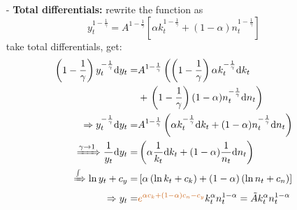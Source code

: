 \documentclass[10pt,landscape,a4paper]{article}
\begin{document}
\begin{multicols*}{3}
\begin{itemize}
\begin{itemize}
        \item[-] \textbf{Total differentials:} rewrite the function as 
        $$
            y_t^{1-\frac{1}{\gamma}}=A^{1-\frac{1}{\gamma}}\left[\alpha k_t^{1-\frac{1}{\gamma}}+(1-\alpha)n_t^{1-\frac{1}{\gamma}}\right]
        $$
        take total differentials, get:
        \begin{align*}
            \left(1-\frac{1}{\gamma}\right)y_t^{-\frac{1}{\gamma}}\mathrm{d}y_t =& A^{1-\frac{1}{\gamma}}\left(\left(1-\frac{1}{\gamma}\right)\alpha k_t^{-\frac{1}{\gamma}}\mathrm{d}k_t\right.\\
            &+\left.\left(1-\frac{1}{\gamma}\right)(1-\alpha)n_t^{-\frac{1}{\gamma}}\mathrm{d}n_t\right)\\
            \Rightarrow y_t^{-\frac{1}{\gamma}}\mathrm{d}y_t =&A^{1-\frac{1}{\gamma}}\left(\alpha k_t^{-\frac{1}{\gamma}}\mathrm{d}k_t +(1-\alpha)n_t^{-\frac{1}{\gamma}}\mathrm{d}n_t\right)\\
            \xRightarrow{\gamma\rightarrow 1} \frac{1}{y_t}\mathrm{d}y_t=&\left(\alpha\frac{1}{k_t}\mathrm{d}k_t+(1-\alpha)\frac{1}{n_t}\mathrm{d}n_t \right)\\
            \xRightarrow{\int} \ln y_t +c_y =& \left[\alpha\left(\ln k_t+c_k\right)+(1-\alpha)\left( \ln n_t+c_n\right) \right]\\
            \Rightarrow y_t =& {\color{myorange}e^{\alpha c_k+(1-\alpha)c_n-c_y}}k_t^{\alpha}n_t^{1-\alpha}=\tilde{A}k_t^{\alpha}n_t^{1-\alpha}
        \end{align*}
        

\end{itemize}
\end{itemize}
\end{multicols*}
\end{document}
